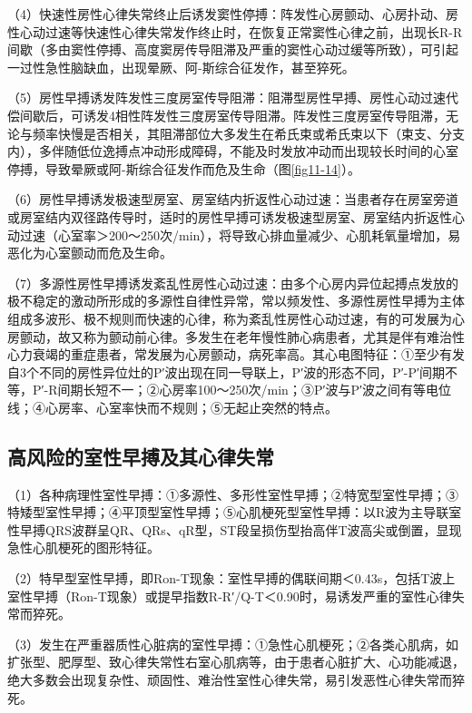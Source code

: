 （4）快速性房性心律失常终止后诱发窦性停搏：阵发性心房颤动、心房扑动、房性心动过速等快速性心律失常发作终止时，在恢复正常窦性心律之前，出现长R-R间歇（多由窦性停搏、高度窦房传导阻滞及严重的窦性心动过缓等所致），可引起一过性急性脑缺血，出现晕厥、阿-斯综合征发作，甚至猝死。

（5）房性早搏诱发阵发性三度房室传导阻滞：阻滞型房性早搏、房性心动过速代偿间歇后，可诱发4相性阵发性三度房室传导阻滞。阵发性三度房室传导阻滞，无论与频率快慢是否相关，其阻滞部位大多发生在希氏束或希氏束以下（束支、分支内），多伴随低位逸搏点冲动形成障碍，不能及时发放冲动而出现较长时间的心室停搏，导致晕厥或阿-斯综合征发作而危及生命（图\ref{fig11-14}）。

（6）房性早搏诱发极速型房室、房室结内折返性心动过速：当患者存在房室旁道或房室结内双径路传导时，适时的房性早搏可诱发极速型房室、房室结内折返性心动过速（心室率＞200～250次/min），将导致心排血量减少、心肌耗氧量增加，易恶化为心室颤动而危及生命。

（7）多源性房性早搏诱发紊乱性房性心动过速：由多个心房内异位起搏点发放的极不稳定的激动所形成的多源性自律性异常，常以频发性、多源性房性早搏为主体组成多波形、极不规则而快速的心律，称为紊乱性房性心动过速，有的可发展为心房颤动，故又称为颤动前心律。多发生在老年慢性肺心病患者，尤其是伴有难治性心力衰竭的重症患者，常发展为心房颤动，病死率高。其心电图特征：①至少有发自3个不同的房性异位灶的P′波出现在同一导联上，P′波的形态不同，P′-P′间期不等，P′-R间期长短不一；②心房率100～250次/min；③P′波与P′波之间有等电位线；④心房率、心室率快而不规则；⑤无起止突然的特点。

\protect\hypertarget{text00018.htmlux5cux23subid168}{}{}

\subsection{高风险的室性早搏及其心律失常}

（1）各种病理性室性早搏：①多源性、多形性室性早搏；②特宽型室性早搏；③特矮型室性早搏；④平顶型室性早搏；⑤心肌梗死型室性早搏：以R波为主导联室性早搏QRS波群呈QR、QRs、qR型，ST段呈损伤型抬高伴T波高尖或倒置，显现急性心肌梗死的图形特征。

（2）特早型室性早搏，即Ron-T现象：室性早搏的偶联间期＜0.43s，包括T波上室性早搏（Ron-T现象）或提早指数R-R′/Q-T＜0.90时，易诱发严重的室性心律失常而猝死。

（3）发生在严重器质性心脏病的室性早搏：①急性心肌梗死；②各类心肌病，如扩张型、肥厚型、致心律失常性右室心肌病等，由于患者心脏扩大、心功能减退，绝大多数会出现复杂性、顽固性、难治性室性心律失常，易引发恶性心律失常而猝死。

